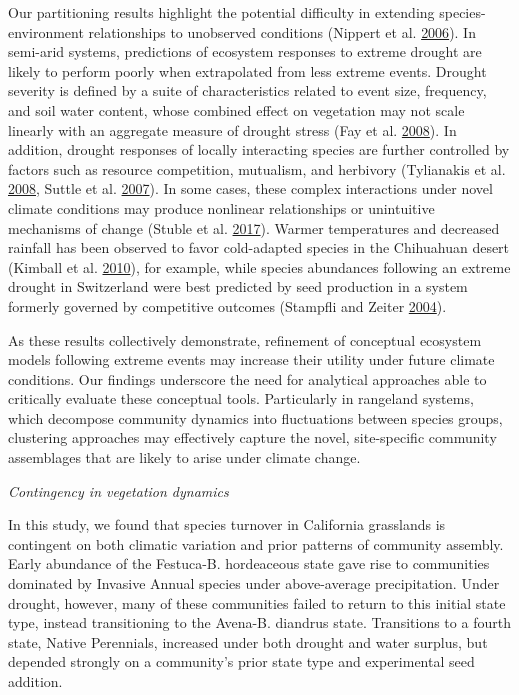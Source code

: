 \documentclass[twoside,12pt,final]{ucthesis-CA2012}
\begin{document}
\begin{ucmainmatter}
Our partitioning results highlight the potential difficulty in extending species-environment relationships to unobserved conditions (Nippert et al. \protect\hyperlink{ref-Nippert2006}{2006}).
In semi-arid systems, predictions of ecosystem responses to extreme drought are likely to perform poorly when extrapolated from less extreme events.
Drought severity is defined by a suite of characteristics related to event size, frequency, and soil water content, whose combined effect on vegetation may not scale linearly with an aggregate measure of drought stress (Fay et al. \protect\hyperlink{ref-Fay2008}{2008}).
In addition, drought responses of locally interacting species are further controlled by factors such as resource competition, mutualism, and herbivory (Tylianakis et al. \protect\hyperlink{ref-Tylianakis2008}{2008}, Suttle et al. \protect\hyperlink{ref-Suttle2007}{2007}).
In some cases, these complex interactions under novel climate conditions may produce nonlinear relationships or unintuitive mechanisms of change (Stuble et al. \protect\hyperlink{ref-Stuble2017}{2017}).
Warmer temperatures and decreased rainfall has been observed to favor cold-adapted species in the Chihuahuan desert (Kimball et al. \protect\hyperlink{ref-Kimball2010}{2010}), for example, while species abundances following an extreme drought in Switzerland were best predicted by seed production in a system formerly governed by competitive outcomes (Stampfli and Zeiter \protect\hyperlink{ref-Stampfli2004}{2004}).

As these results collectively demonstrate, refinement of conceptual ecosystem models following extreme events may increase their utility under future climate conditions.
Our findings underscore the need for analytical approaches able to critically evaluate these conceptual tools.
Particularly in rangeland systems, which decompose community dynamics into fluctuations between species groups, clustering approaches may effectively capture the novel, site-specific community assemblages that are likely to arise under climate change.

\emph{Contingency in vegetation dynamics}

In this study, we found that species turnover in California grasslands is contingent on both climatic variation and prior patterns of community assembly.
Early abundance of the Festuca-B. hordeaceous state gave rise to communities dominated by Invasive Annual species under above-average precipitation.
Under drought, however, many of these communities failed to return to this initial state type, instead transitioning to the Avena-B. diandrus state.
Transitions to a fourth state, Native Perennials, increased under both drought and water surplus, but depended strongly on a community's prior state type and experimental seed addition.


\end{ucmainmatter}
\end{document}
